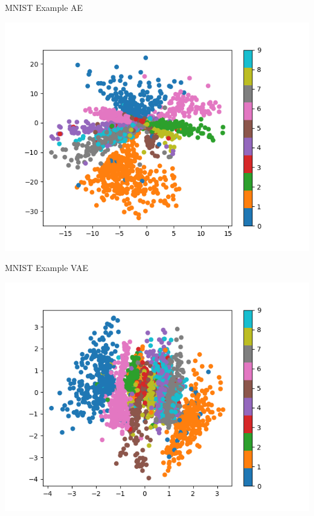 \documentclass[presentation]{beamer}
\begin{document}
\begin{frame}[label={sec:orge958f05}]{MNIST Example AE}
\begin{center}
\includegraphics[width=.9\linewidth]{./van.png}
\end{center}
\end{frame}
\begin{frame}[label={sec:orgfa0d697}]{MNIST Example VAE}
\begin{center}
\includegraphics[width=.9\linewidth]{./vae.png}
\end{center}
\end{frame}
\end{document}
